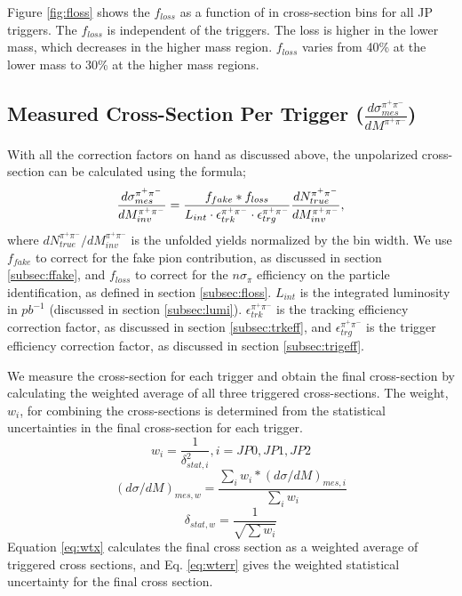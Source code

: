 Figure \ref{fig:floss} shows the $f_{loss}$ as a function of \mpair in cross-section bins for all JP triggers. The $f_{loss}$ is independent of the triggers. The loss is higher in the lower mass, which decreases in the higher mass region.
$f_{loss}$ varies from 40\% at the lower mass to 30\% at the higher mass regions. 

\subsection{Measured Cross-Section Per Trigger ($\frac{d\sigma_{mes}^{\pi^+\pi^-}}{dM^{\pi^+\pi^-}}$)}
With all the correction factors on hand as discussed above, the unpolarized \dipion cross-section can be calculated using the formula;
\begin{equation}
\centering
    \frac{d\sigma^{\pi^+\pi^-}_{mes}}{dM_{inv}^{\pi^+\pi^-}} = \frac{f_{fake}*f_{loss}}{L_{int}\cdot \epsilon_{trk}^{\pi^+\pi^-}\cdot \epsilon_{trg}^{\pi^+\pi^-} }\frac{dN^{\pi^+\pi^-}_{true}}{dM^{\pi^+\pi^-}_{inv}},
    \label{eq:xsec}
\end{equation}
where $dN^{\pi^+\pi^-}_{true}/dM^{\pi^+\pi^-}_{inv}$ is the unfolded yields normalized by the bin width. We use $f_{fake}$ to correct for the fake pion contribution, as discussed in section \ref{subsec:ffake}, and $f_{loss}$ to correct for the $n\sigma_{\pi}$ efficiency on the particle identification, as defined in section \ref{subsec:floss}. $L_{int}$ is the integrated luminosity in $pb^{-1}$ (discussed in section \ref{subsec:lumi}). $\epsilon_{trk}^{\pi^+\pi^-}$ is the tracking efficiency correction factor, as discussed in section \ref{subsec:trkeff}, and $\epsilon_{trg}^{\pi^+\pi^-}$ is the trigger efficiency correction factor, as discussed in section \ref{subsec:trigeff}.

We measure the cross-section for each trigger and obtain the final cross-section by calculating the weighted average of all three triggered cross-sections.
The weight, $w_i$, for combining the cross-sections is determined from the statistical uncertainties in the final cross-section for each trigger.  
\begin{equation}
    w_i = \frac{1}{\delta_{stat, i}^2}, i = JP0, JP1, JP2
\end{equation}
\begin{equation}
\label{eq:wtx}
(d\sigma/dM)_{mes, w} = \frac{\sum_i{w_i * (d\sigma/dM)_{mes,i}}}{\sum_i{w_i}}
\end{equation}
\begin{equation}
\label{eq:wterr}
\delta_{stat,w} = \frac{1}{\sqrt{\sum{w_i}}}
\end{equation}
Equation \ref{eq:wtx} calculates the final cross section as a weighted average of triggered cross sections, and Eq. \ref{eq:wterr} gives the weighted statistical uncertainty for the final cross section. 

